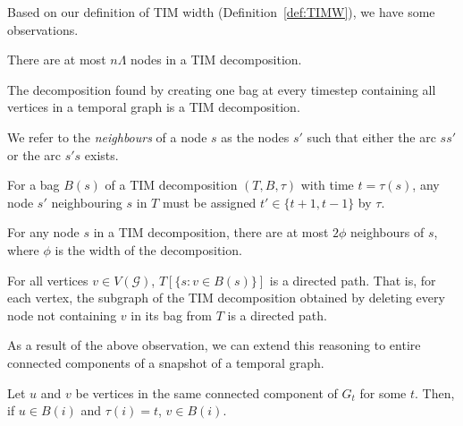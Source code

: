 \documentclass[a4paper,UKenglish,cleveref, autoref, thm-restate]{lipics-v2021} %
\begin{document}
\begin{toappendix}
 Based on our definition of TIM width (Definition~\ref{def:TIMW}), we have some observations.
\begin{observation}\label{obs:tim-node-bound}
    There are at most $n\Lambda$ nodes in a TIM decomposition.
\end{observation}

\begin{observation}\label{obs:tim-all-one-bag}
    The decomposition found by creating one bag at every timestep containing all vertices in a temporal graph is a TIM decomposition.
\end{observation}

We refer to the \emph{neighbours} of a node $s$ as the nodes $s'$ such that either the arc $ss'$ or the arc $s's$ exists.

\begin{observation}\label{obs:tim-neighbours}
    For a bag $B(s)$ of a TIM decomposition $(T,B,\tau)$ with time $t=\tau(s)$, any node $s'$ neighbouring $s$ in $T$ must be assigned $t'\in\{t+1,t-1\}$ by $\tau$.
\end{observation}

\begin{observation}\label{obs:tim-no-children}
    For any node $s$ in a TIM decomposition, there are at most $2\phi$ neighbours of $s$, where $\phi$ is the width of the decomposition.
\end{observation}

\begin{observation}\label{obs:tim-directed-path}
    For all vertices $v\in V(\mathcal{G})$, $T[\{s:v\in B(s)\}]$ is a directed path. That is, for each vertex, the subgraph of the TIM decomposition obtained by deleting every node not containing $v$ in its bag from $T$ is a directed path.
\end{observation}


As a result of the above observation, we can extend this reasoning to entire connected components of a snapshot of a temporal graph.

\begin{observation}\label{obs:tim-connected-component}
    Let $u$ and $v$ be vertices in the same connected component of $G_t$ for some $t$. Then, if $u\in B(i)$ and $\tau(i)=t$, $v\in B(i)$.
\end{observation}


\end{toappendix}
\end{document}
